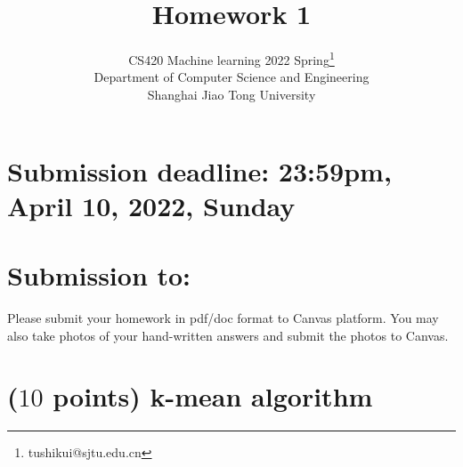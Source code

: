 \documentclass{article}
\title{Homework 1}
\author{
  CS420 Machine learning 2022 Spring\thanks{tushikui@sjtu.edu.cn} \\
  Department of Computer Science and Engineering\\
  Shanghai Jiao Tong University \\
}
\begin{document}

\maketitle


\section*{Submission deadline: 23:59pm, April 10, 2022, Sunday}

\section*{Submission to: }
Please submit your homework in pdf/doc format to Canvas platform. You may also take photos of your hand-written answers and submit the photos to Canvas.


\section{($10$ points) k-mean algorithm}
\end{document}
